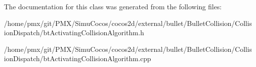 The documentation for this class was generated from the following files\+:\begin{DoxyCompactItemize}
\item 
/home/pmx/git/\+P\+M\+X/\+Simu\+Cocos/cocos2d/external/bullet/\+Bullet\+Collision/\+Collision\+Dispatch/bt\+Activating\+Collision\+Algorithm.\+h\item 
/home/pmx/git/\+P\+M\+X/\+Simu\+Cocos/cocos2d/external/bullet/\+Bullet\+Collision/\+Collision\+Dispatch/bt\+Activating\+Collision\+Algorithm.\+cpp\end{DoxyCompactItemize}
